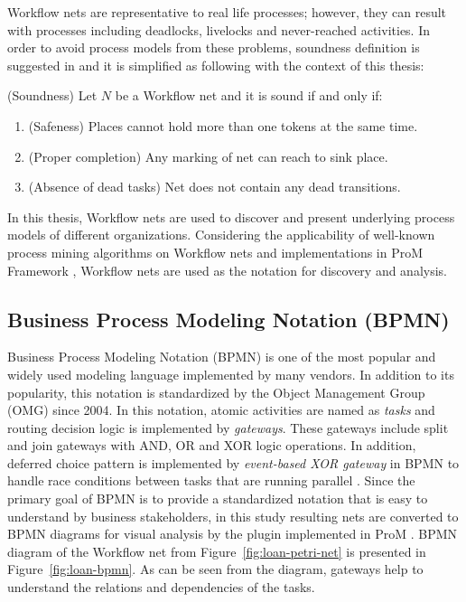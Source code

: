 Workflow nets are representative to real life processes; however, they can result with processes including deadlocks, livelocks and never-reached activities. In order to avoid process models from these problems, soundness definition is suggested in \cite{van1998application} and it is simplified as following with the context of this thesis:
\theoremstyle{definition}
\begin{definition}{}
(Soundness) Let $N$ be a Workflow net and it is sound if and only if:
\begin{enumerate}
  \item  (Safeness) Places cannot hold more than one tokens at the same time.
  \item  (Proper completion) Any marking of net can reach to sink place.
  \item  (Absence of dead tasks) Net does not contain any dead transitions.  
\end{enumerate}
\end{definition}

In this thesis, Workflow nets are used to discover and present underlying process models of different organizations. Considering the applicability of well-known process mining algorithms on Workflow nets and implementations in ProM Framework \cite{verbeek2010prom}, Workflow nets are used as the notation for discovery and analysis.

\subsection{Business Process Modeling Notation (BPMN)}
\label{sec:bpmn} 
Business Process Modeling Notation (BPMN) is one of the most popular and widely used modeling language implemented by many vendors. In addition to its popularity, this notation is standardized by the Object Management Group (OMG) since 2004. In this notation, atomic activities are named as \textit{tasks} and routing decision logic is implemented by \textit{gateways}. These gateways include split and join gateways with AND, OR and XOR logic operations. In addition, deferred choice pattern is implemented by \textit{event-based XOR gateway} in BPMN to handle race conditions between tasks that are running parallel \cite{van2003workflow}. Since the primary goal of BPMN is to provide a standardized notation that is easy to understand by business stakeholders, in this study resulting nets are converted to BPMN diagrams for visual analysis by the plugin implemented in ProM \cite{kalenkovaprocess}. BPMN diagram of the Workflow net from Figure~\ref{fig:loan-petri-net} is presented in Figure~\ref{fig:loan-bpmn}. As can be seen from the diagram, gateways help to understand the relations and dependencies of the tasks.

